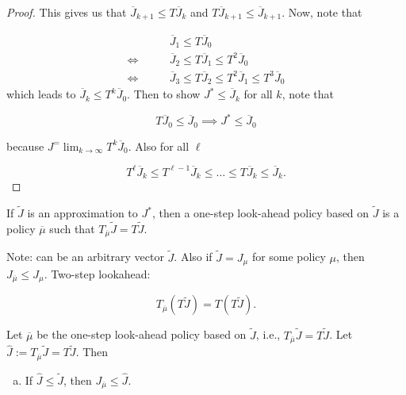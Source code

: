 \begin{enumerate}
\begin{proof}
This gives us that \(\overline{J}_{k+1} \leq T \overline{J}_k\) and \(T \overline{J}_{k+1} \leq \overline{J}_{k+1}\). Now, note that 

\begin{align*}
& \overline{J}_1  \leq T \overline{J}_0
\\  \iff \qquad & \overline{J}_2 \leq T \overline{J}_1  \leq T^2 \overline{J}_0
\\  \iff \qquad & \overline{J}_3 \leq T \overline{J}_2   \leq T^2 \overline{J}_1 \leq T^3 \overline{J}_0
\end{align*}
which leads to \(\overline{J}_k \leq T^k \overline{J}_0\). Then to show \(J^* \leq \overline{J}_k\) for all \(k\), note that

\[
T \overline{J}_0 \leq \overline{J}_0 \implies J^* \leq \overline{J}_0
\]

because \(J^ = \lim_{k \to \infty} T^k \overline{J}_0 \). Also for all \(\ell\)

\[
T^\ell \overline{J}_k \leq T^{\ell-1} \overline{J}_k \leq \ldots \leq T \overline{J}_k \leq \overline{J}_k.
\]

\end{proof}

\begin{definition} If \(\tilde{J}\) is an approximation to \(J^*\), then a one-step look-ahead policy based on \(\tilde{J}\) is a policy \(\overline{\mu}\) such that \(T_{\overline{\mu}} \tilde{J} = T \tilde{J}\). 

\end{definition}

Note: can be an arbitrary vector \(\tilde{J}\). Also if \(\tilde{J} = J_\mu\) for some policy \(\mu\), then \(J_{\overline{\mu}}  \leq J_\mu\). Two-step lookahead:

\[
T_{\overline{\mu}} (T \tilde{J}) = T(T \tilde{J}).
\]



\begin{theorem}

Let \(\overline{\mu}\) be the one-step look-ahead policy based on \(\tilde{J}\), i.e., \(T_{\overline{\mu}} \tilde{J} = T \tilde{J}\). Let \(\hat{J} := T_{\overline{\mu}} \tilde{J} = T \tilde{J}\). Then

\begin{enumerate}[(a)]

\item If \(\hat{J} \leq \tilde{J}\), then \(J_{\overline{\mu}} \leq \hat{J}\).


\end{enumerate}
\end{theorem}
\end{enumerate}

